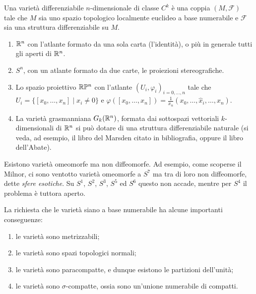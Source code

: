  \begin{definition}
  Una varietà differenziabile $n$-dimensionale di classe $C^k$ è una coppia $(M, \mathcal F)$
  tale che $M$ sia uno spazio topologico localmente euclideo a base numerabile e $\mathcal F$ sia una struttura
  differenziabile su $M$.
 \end{definition}
 
 \begin{example}
  \begin{enumerate}
   \item $\mathbb R^n$ con l'atlante formato da una sola carta (l'identità), o più in generale tutti gli aperti di $\mathbb R^n$.
   \item $S^n$, con un atlante formato da due carte, le proiezioni stereografiche.
   \item Lo spazio proiettivo $\mathbb R\mathbb P^n$ con l'atlante $(U_i,\varphi_i)_{i=0,\dots,n}$ tale che
   $U_i=\{ [x_0,\dots,x_n]\; |\; x_i\neq 0\}$ e $\varphi([x_0,\dots,x_n])=\frac{1}{x_n}(x_0,\dots,\hat x_i,\dots,x_n)$.
   \item La varietà grasmanniana $G_k(\mathbb R^n)$, formata dai sottospazi vettoriali $k$-dimensionali
   di $\mathbb R^n$ si può dotare di una struttura differenziabile naturale (si veda, ad
   esempio, il libro del Marsden citato in bibliografia, oppure il libro dell'Abate).
  \end{enumerate}
 \end{example}
 
 \begin{remark}
  Esistono varietà omeomorfe ma non diffeomorfe. Ad esempio, come scoperse il Milnor, ci sono ventotto varietà
  omeomorfe a $S^7$ ma tra di loro non diffeomorfe, dette \emph{sfere esotiche}. Su $S^1$, $S^2$, $S^3$, $S^5$
  ed $S^6$ questo non accade, mentre per $S^4$ il problema è tuttora aperto.
 \end{remark}
 
 \begin{remark}
  La richiesta che le varietà siano a base numerabile ha alcune importanti conseguenze:
  \begin{enumerate}
   \item le varietà sono metrizzabili;
   \item le varietà sono spazi topologici normali;
   \item le varietà sono paracompatte, e dunque esistono le partizioni dell'unità;
   \item le varietà sono $\sigma$-compatte, ossia sono un'unione numerabile di compatti.
  \end{enumerate}
 \end{remark}

